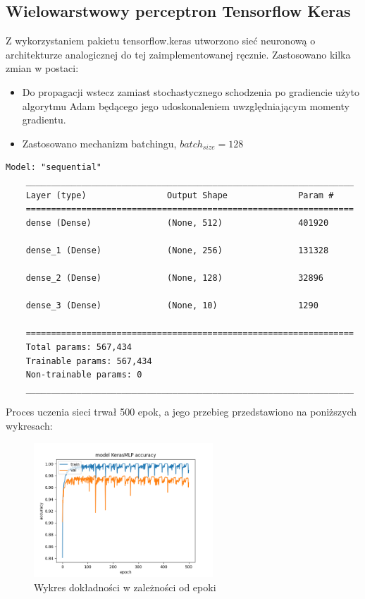 \documentclass{article}
\begin{document}
\subsection{Wielowarstwowy perceptron Tensorflow Keras}

Z wykorzystaniem pakietu tensorflow.keras utworzono sieć neuronową o architekturze 
analogicznej do tej zaimplementowanej ręcznie. Zastosowano kilka zmian w postaci:

\begin{itemize}
\item Do propagacji wstecz zamiast stochastycznego schodzenia po gradiencie użyto algorytmu 
Adam będącego jego udoskonaleniem uwzględniającym momenty gradientu.
\item Zastosowano mechanizm batchingu, $batch_{size} = 128$
\end{itemize}

\begin{lstlisting}[style=siec]
    Model: "sequential"
    _________________________________________________________________
    Layer (type)                Output Shape              Param #
    =================================================================
    dense (Dense)               (None, 512)               401920

    dense_1 (Dense)             (None, 256)               131328

    dense_2 (Dense)             (None, 128)               32896

    dense_3 (Dense)             (None, 10)                1290
                                                                    
    =================================================================
    Total params: 567,434
    Trainable params: 567,434
    Non-trainable params: 0
    _________________________________________________________________
\end{lstlisting}

Proces uczenia sieci trwał 500 epok, a jego przebieg przedstawiono na poniższych wykresach:

\begin{figure}[H]
    \centering
    \includegraphics[width=0.6\textwidth]{../Saves/KerasMLP/mnist-784/KerasMLP_mnist_784_ep500_acc.png}
    \caption{Wykres dokładności w zależności od epoki}
\end{figure}
\end{document}
